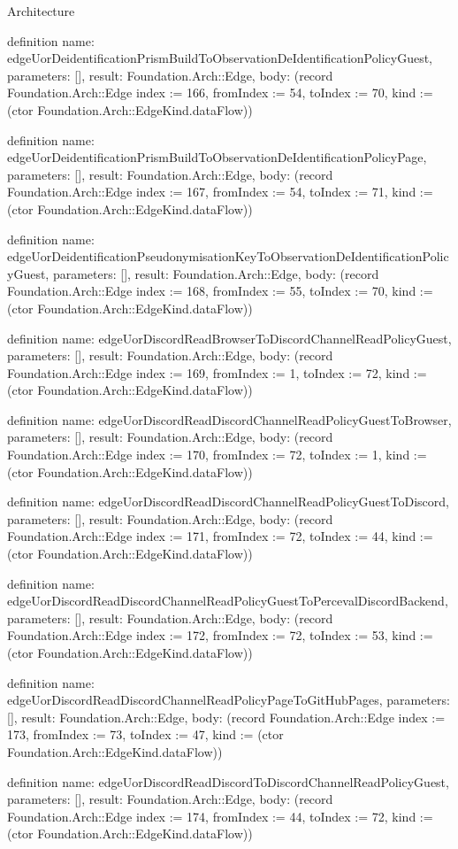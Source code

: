 \begin{lexlean}{Architecture}
\begin{semanticmodule}
definition{
  name: edgeUorDeidentificationPrismBuildToObservationDeIdentificationPolicyGuest,
  parameters: [],
  result: Foundation.Arch::Edge,
  body: (record Foundation.Arch::Edge {index := 166, fromIndex := 54, toIndex := 70, kind := (ctor Foundation.Arch::EdgeKind.dataFlow)})
}

definition{
  name: edgeUorDeidentificationPrismBuildToObservationDeIdentificationPolicyPage,
  parameters: [],
  result: Foundation.Arch::Edge,
  body: (record Foundation.Arch::Edge {index := 167, fromIndex := 54, toIndex := 71, kind := (ctor Foundation.Arch::EdgeKind.dataFlow)})
}

definition{
  name: edgeUorDeidentificationPseudonymisationKeyToObservationDeIdentificationPolicyGuest,
  parameters: [],
  result: Foundation.Arch::Edge,
  body: (record Foundation.Arch::Edge {index := 168, fromIndex := 55, toIndex := 70, kind := (ctor Foundation.Arch::EdgeKind.dataFlow)})
}

definition{
  name: edgeUorDiscordReadBrowserToDiscordChannelReadPolicyGuest,
  parameters: [],
  result: Foundation.Arch::Edge,
  body: (record Foundation.Arch::Edge {index := 169, fromIndex := 1, toIndex := 72, kind := (ctor Foundation.Arch::EdgeKind.dataFlow)})
}

definition{
  name: edgeUorDiscordReadDiscordChannelReadPolicyGuestToBrowser,
  parameters: [],
  result: Foundation.Arch::Edge,
  body: (record Foundation.Arch::Edge {index := 170, fromIndex := 72, toIndex := 1, kind := (ctor Foundation.Arch::EdgeKind.dataFlow)})
}

definition{
  name: edgeUorDiscordReadDiscordChannelReadPolicyGuestToDiscord,
  parameters: [],
  result: Foundation.Arch::Edge,
  body: (record Foundation.Arch::Edge {index := 171, fromIndex := 72, toIndex := 44, kind := (ctor Foundation.Arch::EdgeKind.dataFlow)})
}

definition{
  name: edgeUorDiscordReadDiscordChannelReadPolicyGuestToPercevalDiscordBackend,
  parameters: [],
  result: Foundation.Arch::Edge,
  body: (record Foundation.Arch::Edge {index := 172, fromIndex := 72, toIndex := 53, kind := (ctor Foundation.Arch::EdgeKind.dataFlow)})
}

definition{
  name: edgeUorDiscordReadDiscordChannelReadPolicyPageToGitHubPages,
  parameters: [],
  result: Foundation.Arch::Edge,
  body: (record Foundation.Arch::Edge {index := 173, fromIndex := 73, toIndex := 47, kind := (ctor Foundation.Arch::EdgeKind.dataFlow)})
}

definition{
  name: edgeUorDiscordReadDiscordToDiscordChannelReadPolicyGuest,
  parameters: [],
  result: Foundation.Arch::Edge,
  body: (record Foundation.Arch::Edge {index := 174, fromIndex := 44, toIndex := 72, kind := (ctor Foundation.Arch::EdgeKind.dataFlow)})
}


\end{semanticmodule}
\end{lexlean}

